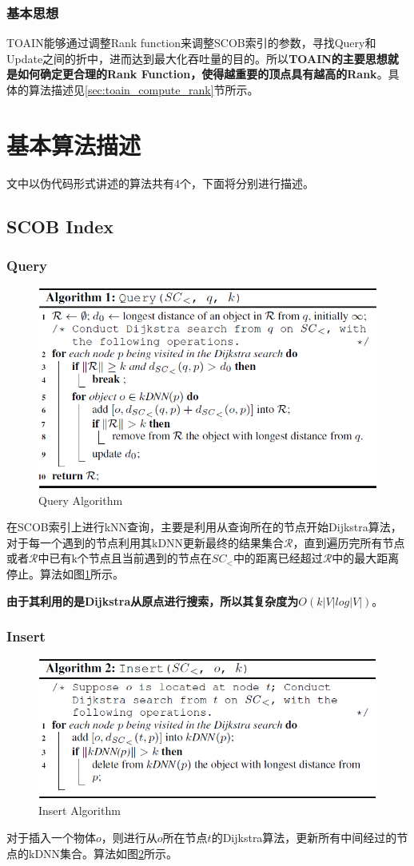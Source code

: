 \documentclass{ML}
\begin{document}
\subsubsection{基本思想}
TOAIN能够通过调整Rank function来调整SCOB索引的参数，寻找Query和Update之间的折中，进而达到最大化吞吐量的目的。所以\textbf{TOAIN的主要思想就是如何确定更合理的Rank Function，使得越重要的顶点具有越高的Rank}。具体的算法描述见\ref{sec:toain_compute_rank}节所示。
\section{基本算法描述}
文中以伪代码形式讲述的算法共有4个，下面将分别进行描述。
\subsection{SCOB Index}\label{sec:scob_index}
\subsubsection{Query}
\begin{figure}[htb]
	\centering
	\includegraphics[width=0.6\linewidth]{media/query.png}
	\caption{Query Algorithm}\label{fig:query}
\end{figure}
在SCOB索引上进行kNN查询，主要是利用从查询所在的节点开始Dijkstra算法，对于每一个遇到的节点利用其kDNN更新最终的结果集合$\mathcal{R}$，直到遍历完所有节点或者$\mathcal{R}$中已有k个节点且当前遇到的节点在$SC_{<}$中的距离已经超过$\mathcal{R}$中的最大距离停止。算法如图\ref{fig:query}所示。

\textbf{由于其利用的是Dijkstra从原点进行搜索，所以其复杂度为$O(k|V|log|V|)$}。
\subsubsection{Insert}
\begin{figure}[htb]
	\centering
	\includegraphics[width=0.6\linewidth]{media/insert.png}
	\caption{Insert Algorithm}\label{fig:insert}
\end{figure}
对于插入一个物体$o$，则进行从$o$所在节点$t$的Dijkstra算法，更新所有中间经过的节点的kDNN集合。算法如图\ref{fig:insert}所示。
\end{document}
